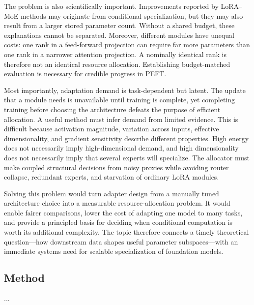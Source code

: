 \documentclass{article}
\begin{document}
The problem is also scientifically important. Improvements reported by LoRA--MoE methods may originate from conditional specialization, but they may also result from a larger stored parameter count. Without a shared budget, these explanations cannot be separated. Moreover, different modules have unequal costs: one rank in a feed-forward projection can require far more parameters than one rank in a narrower attention projection. A nominally identical rank is therefore not an identical resource allocation. Establishing budget-matched evaluation is necessary for credible progress in PEFT.

Most importantly, adaptation demand is task-dependent but latent. The update that a module needs is unavailable until training is complete, yet completing training before choosing the architecture defeats the purpose of efficient allocation. A useful method must infer demand from limited evidence. This is difficult because activation magnitude, variation across inputs, effective dimensionality, and gradient sensitivity describe different properties. High energy does not necessarily imply high-dimensional demand, and high dimensionality does not necessarily imply that several experts will specialize. The allocator must make coupled structural decisions from noisy proxies while avoiding router collapse, redundant experts, and starvation of ordinary LoRA modules.

Solving this problem would turn adapter design from a manually tuned architecture choice into a measurable resource-allocation problem. It would enable fairer comparisons, lower the cost of adapting one model to many tasks, and provide a principled basis for deciding when conditional computation is worth its additional complexity. The topic therefore connects a timely theoretical question---how downstream data shapes useful parameter subspaces---with an immediate systems need for scalable specialization of foundation models.

\subsection{Method}

...
\end{document}
